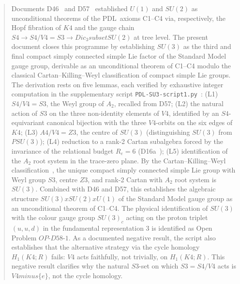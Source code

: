 \documentclass[11pt,a4paper]{article}
\def\Sfour{S4}%
\def\Vfour{V4}%
\def\Afour{A4}%
\def\Sthree{S3}%
\def\Zthree{Z3}%
\def\SUthree{SU(3)}%
\def\SUtwo{SU(2)}%
\def\Uone{U(1)}%
\def\PSUthree{PSU(3)}%
\def\Kfour{K4}%
\def\Re{Re}%
\def\PDL{PDL}%
\def\cong{=}%
\def\times{x}%
\def\setminus{ minus }%
\def\subset{ subset }%
\def\_{-}%
\def\Dic{Dic}%
\def\RR{R}%
\def\mathbb#1{#1}%
\def\mathrm#1{#1}%
\def\mathbf#1{#1}%
\def\textsc#1{#1}%
\theoremstyle{plain}
\theoremstyle{definition}
\theoremstyle{remark}
\newcommand{\PDL}{\textsc{PDL}}
\newcommand{\Kfour}{K_4}
\newcommand{\Sfour}{S_4}
\newcommand{\Afour}{A_4}
\newcommand{\Vfour}{V_4}
\newcommand{\Sthree}{S_3}
\newcommand{\Zthree}{\mathbb{Z}_3}
\newcommand{\SUthree}{\mathrm{SU}(3)}
\newcommand{\SUtwo}{\mathrm{SU}(2)}
\newcommand{\Uone}{\mathrm{U}(1)}
\newcommand{\PSUthree}{\mathrm{PSU}(3)}
\newcommand{\Dic}{\mathrm{Dic}}
\renewcommand{\Re}{R_e}
\newcommand{\RR}{\mathbb{R}}
\begin{document}
\begin{abstract}
Documents D46~\cite{PDL_D46} and D57~\cite{PDL_D57} established $\Uone$ and $\SUtwo$ as unconditional theorems of the \PDL\ axioms C1--C4 via, respectively, the Hopf fibration of $\Kfour$ and the gauge chain $\Sfour \to \Sfour/\Vfour \cong \Sthree \to \Dic_3 \subset \SUtwo$ at tree level. The present document closes this programme by establishing $\SUthree$ as the third and final compact simply connected simple Lie factor of the Standard Model gauge group, derivable as an unconditional theorem of C1--C4 modulo the classical Cartan--Killing--Weyl classification of compact simple Lie groups. The derivation rests on five lemmas, each verified by exhaustive integer computation in the supplementary script \texttt{PDL\_SU3\_script1.py}~\cite{PDL_SU3_script1}: (L1) $\Sfour/\Vfour \cong \Sthree$, the Weyl group of $A_2$, recalled from D57; (L2) the natural action of $\Sthree$ on the three non-identity elements of $\Vfour$, identified by an $\Sfour$-equivariant canonical bijection with the three $\Vfour$-orbits on the six edges of $\Kfour$; (L3) $\Afour/\Vfour \cong \Zthree$, the centre of $\SUthree$ (distinguishing $\SUthree$ from $\PSUthree$); (L4) reduction to a rank-2 Cartan subalgebra forced by the invariance of the relational budget $\Re = 6$ (D16a~\cite{PDL_D16a}); (L5) identification of the $A_2$ root system in the trace-zero plane. By the Cartan--Killing--Weyl classification~\cite{Bourbaki_Lie,Humphreys_Lie}, the unique compact simply connected simple Lie group with Weyl group $\Sthree$, centre $\Zthree$, and rank-2 Cartan with $A_2$ root system is $\SUthree$. Combined with D46 and D57, this establishes the algebraic structure $\SUthree \times \SUtwo \times \Uone$ of the Standard Model gauge group as an unconditional theorem of C1--C4. The physical identification of $\SUthree$ with the colour gauge group $\SUthree_{\mathrm{c}}$ acting on the proton triplet $(u,u,d)$ in the fundamental representation $\mathbf{3}$ is identified as Open Problem $\mathrm{OP\text{-}D58\text{-}1}$. As a documented negative result, the script also establishes that the alternative strategy via the cycle homology $H_1(\Kfour;\RR)$ fails: $\Vfour$ acts faithfully, not trivially, on $H_1(\Kfour;\RR)$. This negative result clarifies why the natural $\Sthree$-set on which $\Sthree = \Sfour/\Vfour$ acts is $\Vfour \setminus \{e\}$, not the cycle homology.
\end{abstract}

\clearpage
\end{document}
